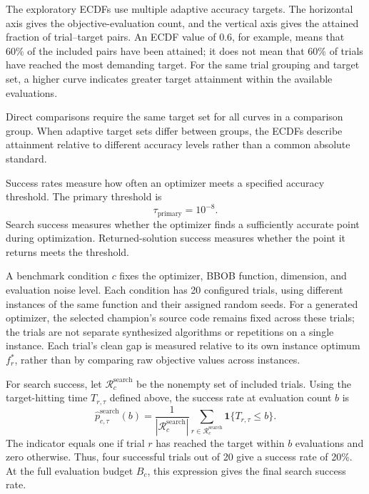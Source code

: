 The exploratory ECDFs use multiple adaptive accuracy targets. The
horizontal axis gives the objective-evaluation count, and the vertical
axis gives the attained fraction of trial--target pairs. An ECDF value
of $0.6$, for example, means that 60\% of the included pairs have been
attained; it does not mean that 60\% of trials have reached the most
demanding target. For the same trial grouping and target set, a higher
curve indicates greater target attainment within the available evaluations.

Direct comparisons require the same target set for all curves in a
comparison group. When adaptive target sets differ between groups, the
ECDFs describe attainment relative to different accuracy levels rather
than a common absolute standard.

Success rates measure how often an optimizer meets a specified accuracy
threshold. The primary threshold is
\begin{equation}
    \tau_{\mathrm{primary}}=10^{-8}.
    \label{eq:benchmark_primary_threshold}
\end{equation}
Search success measures whether the optimizer finds a sufficiently
accurate point during optimization. Returned-solution success measures
whether the point it returns meets the threshold.

A benchmark condition $c$ fixes the optimizer, BBOB function, dimension,
and evaluation noise level. Each condition has 20 configured trials,
using different instances of the same function and their assigned
random seeds.
For a generated optimizer, the selected champion's source code remains
fixed across these trials; the trials are not separate synthesized
algorithms or repetitions on a single instance. Each trial's clean gap
is measured relative to its own instance optimum $f_r^*$, rather than
by comparing raw objective values across instances.

For search success, let $\mathcal R_c^{\mathrm{search}}$ be the nonempty
set of included trials. Using the target-hitting time $T_{r,\tau}$
defined above, the success rate at evaluation count $b$ is
\begin{equation}
    \widehat p_{c,\tau}^{\mathrm{search}}(b)
    =
    \frac{1}{|\mathcal R_c^{\mathrm{search}}|}
    \sum_{r\in\mathcal R_c^{\mathrm{search}}}
    \mathbf{1}\{T_{r,\tau}\leq b\}.
    \label{eq:benchmark_search_success}
\end{equation}
The indicator equals one if trial $r$ has reached the target within
$b$ evaluations and zero otherwise. Thus, four successful trials out
of 20 give a success rate of 20\%. At the full evaluation budget $B_c$,
this expression gives the final search success rate.

